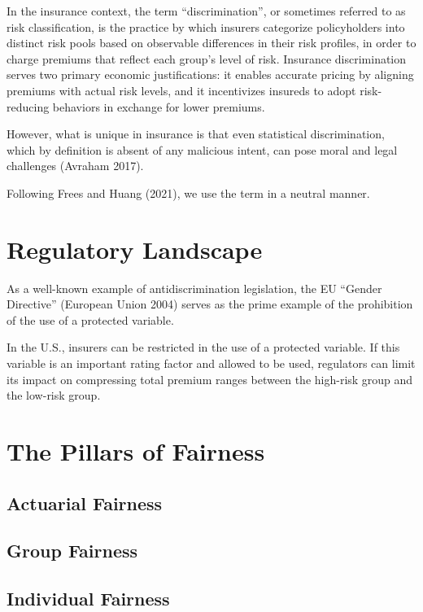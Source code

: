 \documentclass[
  a4paper,
  11pt,
  a4paper,
  twoside,
  openright]{report}
\begin{document}
In the insurance context, the term ``discrimination'', or sometimes
referred to as risk classification, is the practice by which insurers
categorize policyholders into distinct risk pools based on observable
differences in their risk profiles, in order to charge premiums that
reflect each group's level of risk. Insurance discrimination serves two
primary economic justifications: it enables accurate pricing by aligning
premiums with actual risk levels, and it incentivizes insureds to adopt
risk-reducing behaviors in exchange for lower premiums.

However, what is unique in insurance is that even statistical
discrimination, which by definition is absent of any malicious intent,
can pose moral and legal challenges (Avraham 2017).

Following Frees and Huang (2021), we use the term in a neutral manner.

\section{Regulatory Landscape}\label{regulatory-landscape}

As a well-known example of antidiscrimination legislation, the EU
``Gender Directive'' (European Union 2004) serves as the prime example
of the prohibition of the use of a protected variable.

In the U.S., insurers can be restricted in the use of a protected
variable. If this variable is an important rating factor and allowed to
be used, regulators can limit its impact on compressing total premium
ranges between the high-risk group and the low-risk group.

\section{The Pillars of Fairness}\label{the-pillars-of-fairness}

\subsection{Actuarial Fairness}\label{actuarial-fairness}

\subsection{Group Fairness}\label{group-fairness}

\subsection{Individual Fairness}\label{individual-fairness}
\end{document}

